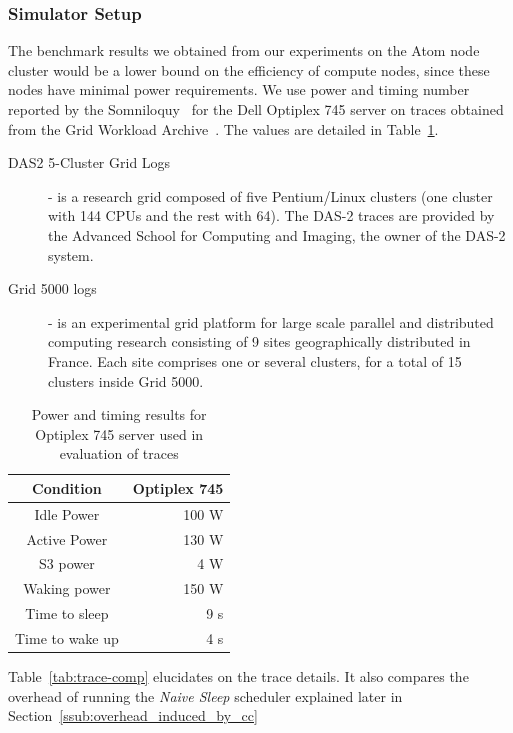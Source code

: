 \subsubsection{Simulator Setup} %
\label{sub:trace_driven_simulation}
The benchmark results we obtained from our experiments on the Atom node cluster would be a lower bound on the efficiency of compute nodes, since these nodes have minimal power requirements. We use power and timing number reported by the Somniloquy~\cite{Yuvraj:09} for the Dell Optiplex 745 server on traces obtained from the Grid Workload Archive~\cite{gwa}. The values are detailed in Table~\ref{tab:optiplex}.
\begin{description}
    \item[DAS2 5-Cluster Grid Logs] - is a research grid composed of five Pentium/Linux clusters (one cluster with 144 CPUs and the rest with 64). The DAS-2 traces are provided by the Advanced School for Computing and Imaging, the owner of the DAS-2 system.
    \item[Grid 5000 logs] - is an experimental grid platform for large scale parallel and distributed computing research consisting of 9 sites geographically distributed in France. Each site comprises one or  several clusters, for a total of 15 clusters inside Grid 5000.
\end{description}

\begin{table}[tp]
    \label{tab:optiplex}
    \centering
    \begin{tabular}{|c|r|}
        \hline
        {\bf Condition} & {\bf Optiplex 745}\\
        \hline
        Idle Power & 100 W\\
        \hline
        Active Power & 130 W\\
        \hline
        S3 power & 4 W\\
        \hline
        Waking power & 150 W\\
        \hline
        Time to sleep & 9 s\\
        \hline
        Time to wake up & 4 s\\
        \hline
    \end{tabular}
    \caption{Power and timing results for Optiplex 745 server used in evaluation of traces}
\end{table}

Table~\ref{tab:trace-comp} elucidates on the trace details. It also compares the overhead of running the \emph{Naive Sleep} scheduler explained later in Section~\ref{ssub:overhead_induced_by_cc}


